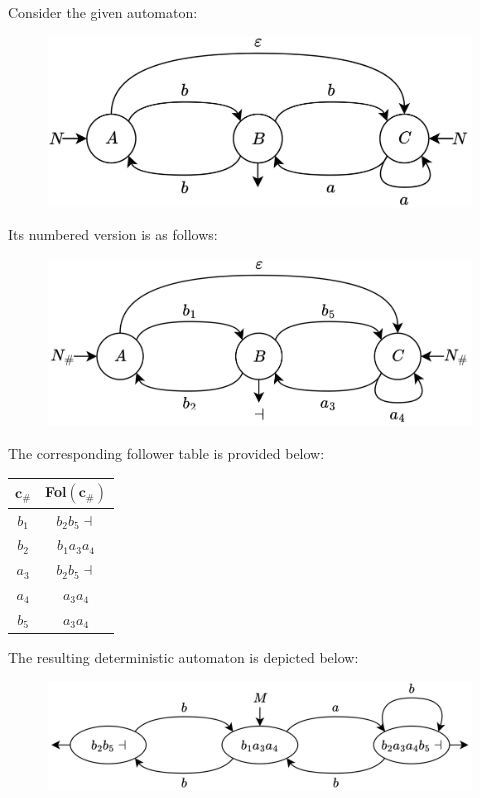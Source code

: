 \begin{example}
    Consider the given automaton:
    \begin{figure}[H]
        \centering
        \includegraphics[width=0.5\linewidth]{images/bs1.png}
    \end{figure}
    Its numbered version is as follows:
    \begin{figure}[H]
        \centering
        \includegraphics[width=0.5\linewidth]{images/bs2.png}
    \end{figure}
    The corresponding follower table is provided below:
    \begin{table}[H]
        \centering
        \begin{tabular}{cc}
        \hline
        \textbf{$\boldsymbol{c_{\#}}$} & \textbf{Fol$(\boldsymbol{c_{\#}})$} \\ \hline
        $b_1$                          & $b_2b_5\dashv$                      \\
        $b_2$                          & $b_1a_3a_4$                         \\
        $a_3$                          & $b_2b_5\dashv$                      \\
        $a_4$                          & $a_3a_4$                            \\
        $b_5$                          & $a_3a_4$                            \\ \hline
        \end{tabular}
    \end{table}
    The resulting deterministic automaton is depicted below:
    \begin{figure}[H]
        \centering
        \includegraphics[width=0.7\linewidth]{images/bs3.png}
    \end{figure}
\end{example}